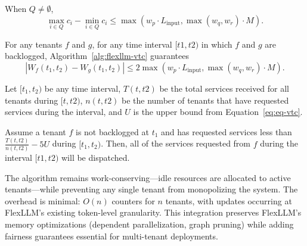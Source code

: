 \begin{lemma}
When $Q \neq \emptyset$,
\begin{equation}\label{eq:eq-vtc}
    \max_{i \in Q} c_i - \min_{i \in Q} c_i \le \max(w_p \cdot L_{\text{input}}, \max(w_q, w_r) \cdot M).
\end{equation}
\end{lemma}

\begin{theorem}
    For any tenants $f$ and $g$, for any time interval $[t1,t2)$ in which $f$ and $g$ are backlogged, Algorithm~\ref{alg:flexllm-vtc} guarantees
\[
    |W_f(t_1, t_2) - W_g(t_1, t_2)| \leq 2\max(w_p \cdot L_{\text{input}}, \max(w_q, w_r) \cdot M).
\]
\end{theorem}

\begin{theorem}
    Let $[t_1, t_2)$ be any time interval, $T(t,t2)$ be the total services received for all tenants during $[t,t2)$, $n(t,t2)$ be the number of tenants that have requested services during the interval, and $U$ is the upper bound from Equation~\ref{eq:eq-vtc}.

    Assume a tenant $f$ is not backlogged at $t_1$ and has requested services less than $\frac{T(t,t2)}{n(t,t2)}-5U$ during $[t_1, t_2)$. Then, all of the services requested from $f$ during the interval $[t1,t2)$ will be dispatched.
\end{theorem}

The algorithm remains work-conserving—idle resources are allocated to active tenants—while preventing any single tenant from monopolizing the system. The overhead is minimal: $O(n)$ counters for $n$ tenants, with updates occurring at FlexLLM's existing token-level granularity. This integration preserves FlexLLM's memory optimizations (dependent parallelization, graph pruning) while adding fairness guarantees essential for multi-tenant deployments.

